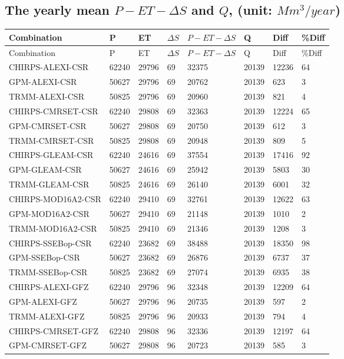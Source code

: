 \documentclass{article}%
\begin{document}
%
\subsection{The yearly mean $P-ET-\Delta S$ and $Q$, (unit: $Mm^3/year$)}%
\label{subsec:TheyearlymeanP{-}ET{-}DeltaSandQ,(unitMm3/year)}%
\begin{longtable}{|l|l|l|l|l|l|l|l|}%
\hline%
\textbf{Combination}&\textbf{P}&\textbf{ET}&\textbf{$\Delta S$}&\textbf{$P-ET-\Delta S$}&\textbf{Q}&\textbf{Diff}&\textbf{\%Diff}\\%
\hline%
\endfirsthead%
\hline%
Combination&P&ET&$\Delta S$&$P-ET-\Delta S$&Q&Diff&\%Diff\\%
\hline%
\endhead%
\hline%
\endfoot%
CHIRPS-ALEXI-CSR&62240&29796&69&32375&20139&12236&64\\%
GPM-ALEXI-CSR&50627&29796&69&20762&20139&623&3\\%
TRMM-ALEXI-CSR&50825&29796&69&20960&20139&821&4\\%
CHIRPS-CMRSET-CSR&62240&29808&69&32363&20139&12224&65\\%
GPM-CMRSET-CSR&50627&29808&69&20750&20139&612&3\\%
TRMM-CMRSET-CSR&50825&29808&69&20948&20139&809&5\\%
CHIRPS-GLEAM-CSR&62240&24616&69&37554&20139&17416&92\\%
GPM-GLEAM-CSR&50627&24616&69&25942&20139&5803&30\\%
TRMM-GLEAM-CSR&50825&24616&69&26140&20139&6001&32\\%
CHIRPS-MOD16A2-CSR&62240&29410&69&32761&20139&12622&63\\%
GPM-MOD16A2-CSR&50627&29410&69&21148&20139&1010&2\\%
TRMM-MOD16A2-CSR&50825&29410&69&21346&20139&1208&3\\%
CHIRPS-SSEBop-CSR&62240&23682&69&38488&20139&18350&98\\%
GPM-SSEBop-CSR&50627&23682&69&26876&20139&6737&37\\%
TRMM-SSEBop-CSR&50825&23682&69&27074&20139&6935&38\\%
CHIRPS-ALEXI-GFZ&62240&29796&96&32348&20139&12209&64\\%
GPM-ALEXI-GFZ&50627&29796&96&20735&20139&597&2\\%
TRMM-ALEXI-GFZ&50825&29796&96&20933&20139&794&4\\%
CHIRPS-CMRSET-GFZ&62240&29808&96&32336&20139&12197&64\\%
GPM-CMRSET-GFZ&50627&29808&96&20723&20139&585&3\\%

\end{longtable}
\end{document}
